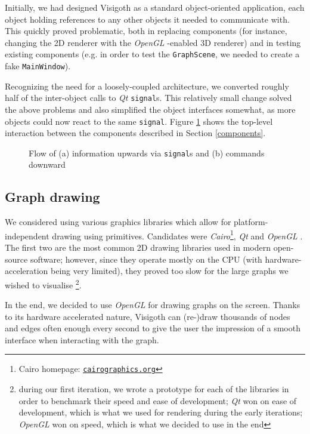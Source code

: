 \documentclass[a4paper,11pt,titlepage]{article}
\let\stdhref\href
\renewcommand{\href}[2]{\stdhref{#1}{\texttt{#2}}}
\newcommand{\code}[1]{\texttt{#1}}
\newcommand{\buzz}[1]{\emph{#1}}
\newcommand{\Qt}{\buzz{Qt} }
\newcommand{\OpenGL}{\buzz{OpenGL} }
\begin{document}
Initially, we had designed Visigoth as a standard object-oriented
application, each object holding references to any other objects it
needed to communicate with. This quickly proved problematic, both in
replacing components (for instance, changing the 2D renderer with the
\OpenGL-enabled 3D renderer) and in testing existing components
(e.g. in order to test the \code{GraphScene}, we needed to create a
fake \code{MainWindow}).

Recognizing the need for a loosely-coupled architecture, we converted
roughly half of the inter-object calls to \Qt \code{signal}s. This
relatively small change solved the above problems and also simplified
the object interfaces somewhat, as more objects could now react to the
same \code{signal}. Figure \ref{fig:interaction} shows the top-level
interaction between the components described in Section
\ref{components}.

\begin{figure}[ht]
  \centering
  
  \caption{Flow of (a) information upwards via \code{signal}s and (b)
    commands downward}
  \label{fig:interaction}
\end{figure}

\subsection{Graph drawing}

We considered using various graphics libraries which allow for
platform-independent drawing using primitives. Candidates were
\buzz{Cairo}\footnote{Cairo homepage:
  \href{http://cairographics.org/}{cairographics.org}}, \Qt and
\OpenGL. The first two are the most common 2D drawing libraries used
in modern open-source software; however, since they operate mostly on
the CPU (with hardware-acceleration being very limited), they proved
too slow for the large graphs we wished to visualise \footnote{during
  our first iteration, we wrote a prototype for each of the libraries
  in order to benchmark their speed and ease of development; \Qt won
  on ease of development, which is what we used for rendering during
  the early iterations; \OpenGL won on speed, which is what we decided
  to use in the end}.

In the end, we decided to use \OpenGL for drawing graphs on the
screen. Thanks to its hardware accelerated nature, Visigoth can
(re-)draw thousands of nodes and edges often enough every second to
give the user the impression of a smooth interface when interacting
with the graph.
\end{document}
